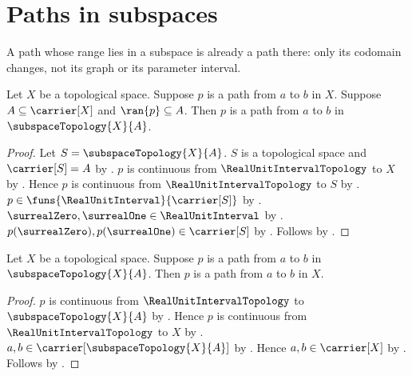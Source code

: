 \section{Paths in subspaces}




A path whose range lies in a subspace is already a path there: only its
codomain changes, not its graph or its parameter interval.

\begin{theorem}\label{path_codomain_corestriction}
    Let $X$ be a topological space.
    Suppose $p$ is a path from $a$ to $b$ in $X$.
    Suppose $A\subseteq\carrier[X]$ and $\ran{p}\subseteq A$.
    Then $p$ is a path from $a$ to $b$ in $\subspaceTopology{X}{A}$.
\end{theorem}
\begin{proof}
    Let $S=\subspaceTopology{X}{A}$.
    $S$ is a topological space and $\carrier[S]=A$ by
        .
    $p$ is continuous from $\RealUnitIntervalTopology$ to $X$ by .
    Hence $p$ is continuous from $\RealUnitIntervalTopology$ to $S$ by
        .
    $p\in\funs{\RealUnitInterval}{\carrier[S]}$ by
        .
    $\surrealZero,\surrealOne\in\RealUnitInterval$ by
        .
    $p(\surrealZero),p(\surrealOne)\in\carrier[S]$ by .
    Follows by .
\end{proof}

\begin{theorem}\label{path_subspace_codomain_inclusion}
    Let $X$ be a topological space.
    Suppose $p$ is a path from $a$ to $b$ in $\subspaceTopology{X}{A}$.
    Then $p$ is a path from $a$ to $b$ in $X$.
\end{theorem}
\begin{proof}
    $p$ is continuous from $\RealUnitIntervalTopology$ to $\subspaceTopology{X}{A}$ by
        .
    Hence $p$ is continuous from $\RealUnitIntervalTopology$ to $X$ by
        .
    $a,b\in\carrier[\subspaceTopology{X}{A}]$ by .
    Hence $a,b\in\carrier[X]$ by .
    Follows by .
\end{proof}

